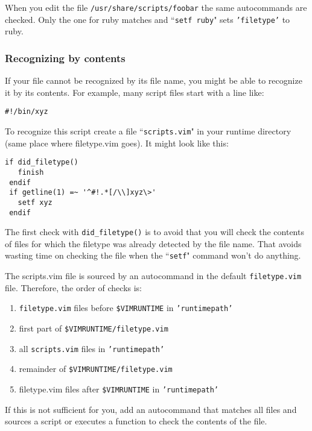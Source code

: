 When you edit the file \texttt{/usr/share/scripts/foobar} the same autocommands are checked.
Only the one for ruby matches and ``\texttt{setf ruby}" sets \texttt{'filetype'} to ruby.

\subsubsection{Recognizing by contents}
If your file cannot be recognized by its file name, you might be able to recognize it by its contents.
For example, many script files start with a line like:

\begin{Verbatim}[samepage=true]
    #!/bin/xyz
\end{Verbatim}

To recognize this script create a file ``\texttt{scripts.vim}" in your runtime directory (same place where filetype.vim goes).
It might look like this:

\begin{Verbatim}[samepage=true]
 if did_filetype()
   finish
 endif
 if getline(1) =~ '^#!.*[/\\]xyz\>'
   setf xyz
 endif
\end{Verbatim}

The first check with \texttt{did\_filetype()} is to avoid that you will check the contents of files for which the filetype was already detected by the file name.
That avoids wasting time on checking the file when the ``\texttt{setf}" command won't do anything.

The scripts.vim file is sourced by an autocommand in the default \texttt{filetype.vim} file.
Therefore, the order of checks is:

\begin{enumerate}
				\item \texttt{filetype.vim} files before \texttt{\$VIMRUNTIME} in \texttt{'runtimepath'}
				\item first part of \texttt{\$VIMRUNTIME/filetype.vim}
				\item all \texttt{scripts.vim} files in \texttt{'runtimepath'}
				\item remainder of \texttt{\$VIMRUNTIME/filetype.vim}
				\item filetype.vim files after \texttt{\$VIMRUNTIME} in \texttt{'runtimepath'}
\end{enumerate}

If this is not sufficient for you, add an autocommand that matches all files and sources a script or executes a function to check the contents of the file.
\clearpage
